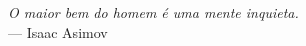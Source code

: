 \begin{titlepage}
\thispagestyle{empty}
\vspace*{\fill}

\begin{flushright}
  \textit{O maior bem do homem é uma mente inquieta.}\\
  \vspace{0.5\baselineskip}
  {\small — Isaac Asimov}
\end{flushright}
\end{titlepage}

